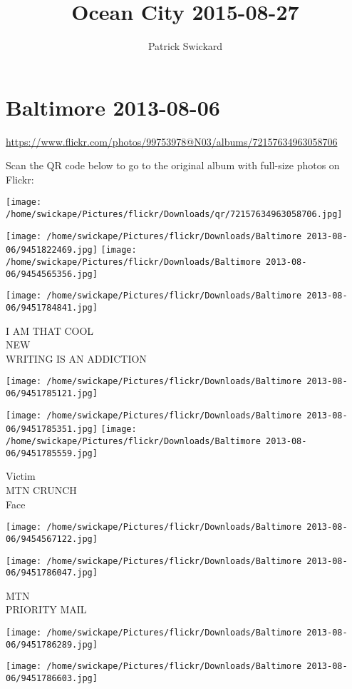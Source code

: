 \documentclass[10pt,letterpaper]{article}
\title{Ocean City 2015-08-27}
\author{Patrick Swickard}
\date{}
\begin{document}
\section*{Baltimore 2013-08-06}

\url{https://www.flickr.com/photos/99753978@N03/albums/72157634963058706}

Scan the QR code below to go to the original album with full-size photos on Flickr:

\texttt{[image: /home/swickape/Pictures/flickr/Downloads/qr/72157634963058706.jpg]}
\pagebreak

\texttt{[image: /home/swickape/Pictures/flickr/Downloads/Baltimore 2013-08-06/9451822469.jpg]}
\texttt{[image: /home/swickape/Pictures/flickr/Downloads/Baltimore 2013-08-06/9454565356.jpg]}

\texttt{[image: /home/swickape/Pictures/flickr/Downloads/Baltimore 2013-08-06/9451784841.jpg]}

I AM THAT COOL\\
NEW\\
WRITING IS AN ADDICTION
\pagebreak

\texttt{[image: /home/swickape/Pictures/flickr/Downloads/Baltimore 2013-08-06/9451785121.jpg]}

\vspace{0.25in}
\texttt{[image: /home/swickape/Pictures/flickr/Downloads/Baltimore 2013-08-06/9451785351.jpg]}
\texttt{[image: /home/swickape/Pictures/flickr/Downloads/Baltimore 2013-08-06/9451785559.jpg]}

Victim\\
MTN CRUNCH\\
Face
\pagebreak

\texttt{[image: /home/swickape/Pictures/flickr/Downloads/Baltimore 2013-08-06/9454567122.jpg]}

\vspace{0.25in}
\texttt{[image: /home/swickape/Pictures/flickr/Downloads/Baltimore 2013-08-06/9451786047.jpg]}

MTN\\
PRIORITY MAIL
\pagebreak

\texttt{[image: /home/swickape/Pictures/flickr/Downloads/Baltimore 2013-08-06/9451786289.jpg]}

\vspace{0.25in}
\texttt{[image: /home/swickape/Pictures/flickr/Downloads/Baltimore 2013-08-06/9451786603.jpg]}
\end{document}

